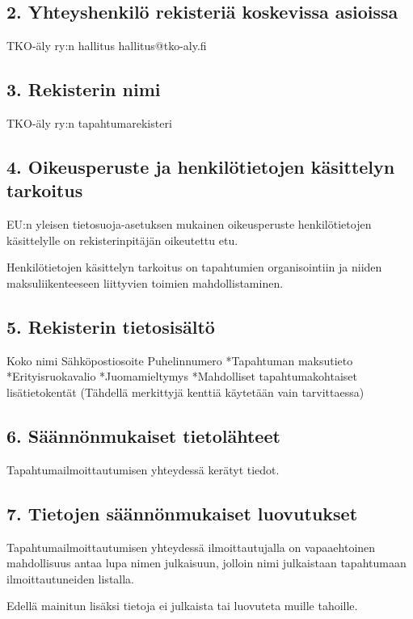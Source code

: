 \documentclass[finnish]{tktltiki}
\begin{document}
\subsection*{2. Yhteyshenkilö rekisteriä koskevissa asioissa}

TKO-äly ry:n hallitus
hallitus@tko-aly.fi

\subsection*{3. Rekisterin nimi}

TKO-äly ry:n tapahtumarekisteri

\subsection*{4. Oikeusperuste ja henkilötietojen käsittelyn tarkoitus}

EU:n yleisen tietosuoja-asetuksen mukainen oikeusperuste henkilötietojen käsittelylle on
rekisterinpitäjän oikeutettu etu.

Henkilötietojen käsittelyn tarkoitus on tapahtumien organisointiin ja niiden maksuliikenteeseen liittyvien toimien mahdollistaminen.

\subsection*{5. Rekisterin tietosisältö}
Koko nimi
Sähköpostiosoite
Puhelinnumero
*Tapahtuman maksutieto
*Erityisruokavalio
*Juomamieltymys
*Mahdolliset tapahtumakohtaiset lisätietokentät
(Tähdellä merkittyjä kenttiä käytetään vain tarvittaessa)

\subsection*{6. Säännönmukaiset tietolähteet}

Tapahtumailmoittautumisen yhteydessä kerätyt tiedot.

\subsection*{7. Tietojen säännönmukaiset luovutukset}

Tapahtumailmoittautumisen yhteydessä ilmoittautujalla on vapaaehtoinen mahdollisuus antaa lupa nimen julkaisuun, jolloin nimi julkaistaan tapahtumaan ilmoittautuneiden listalla.

Edellä mainitun lisäksi tietoja ei julkaista tai luovuteta muille tahoille.
\end{document}

